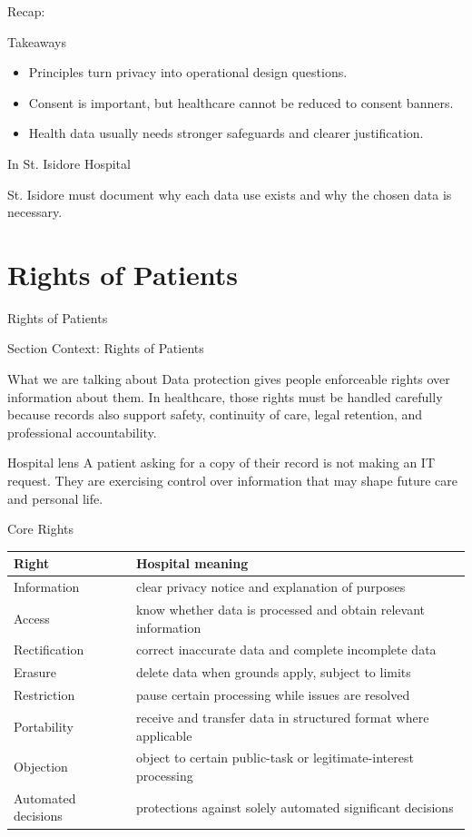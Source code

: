 \documentclass[presentation]{beamer}
\newcommand{\sectiontitleframe}[1]{
\begin{frame}[plain,c]
\begin{center}
{\usebeamerfont{title}\usebeamercolor[fg]{title}#1}
\end{center}
\end{frame}
}
\newcommand{\scenario}{St. Isidore Hospital}
\newcommand{\takeawaysframe}[2]{
\begin{frame}[c]{Recap: \insertsection}
\begin{block}{Takeaways}
#1
\end{block}
\begin{exampleblock}{In \scenario}
#2
\end{exampleblock}
\end{frame}
}
\begin{document}
\takeawaysframe{
\begin{itemize}
    \item Principles turn privacy into operational design questions.
    \item Consent is important, but healthcare cannot be reduced to consent banners.
    \item Health data usually needs stronger safeguards and clearer justification.
\end{itemize}
}{
St. Isidore must document why each data use exists and why the chosen data is necessary.
}

\section{Rights of Patients}
\sectiontitleframe{Rights of Patients}

\begin{frame}[c]{Section Context: Rights of Patients}
\begin{block}{What we are talking about}
Data protection gives people enforceable rights over information about them. In healthcare, those
rights must be handled carefully because records also support safety, continuity of care, legal
retention, and professional accountability.
\end{block}

\begin{exampleblock}{Hospital lens}
A patient asking for a copy of their record is not making an IT request. They are exercising control
over information that may shape future care and personal life.
\end{exampleblock}
\end{frame}

\begin{frame}[c]{Core Rights}
\small
\begin{tabularx}{\textwidth}{@{}p{}X@{}}
\toprule
\textbf{Right} & \textbf{Hospital meaning} \\
\midrule
Information & clear privacy notice and explanation of purposes \\
Access & know whether data is processed and obtain relevant information \\
Rectification & correct inaccurate data and complete incomplete data \\
Erasure & delete data when grounds apply, subject to limits \\
Restriction & pause certain processing while issues are resolved \\
Portability & receive and transfer data in structured format where applicable \\
Objection & object to certain public-task or legitimate-interest processing \\
Automated decisions & protections against solely automated significant decisions \\
\bottomrule
\end{tabularx}
\end{frame}
\end{document}
